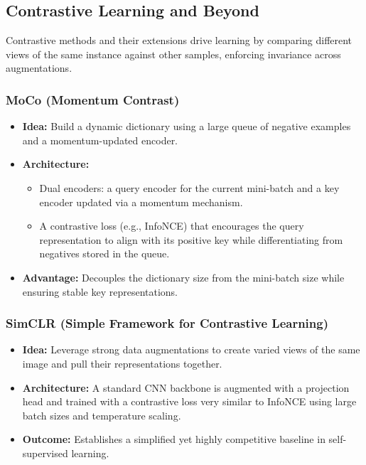 \documentclass{article}
\begin{document}
\subsection{Contrastive Learning and Beyond}

Contrastive methods and their extensions drive learning by comparing different views of the same instance against other samples, enforcing invariance across augmentations.

\subsubsection{MoCo (Momentum Contrast)}
\begin{itemize}
    \item \textbf{Idea:} Build a dynamic dictionary using a large queue of negative examples and a momentum-updated encoder.
    \item \textbf{Architecture:} 
    \begin{itemize}
        \item Dual encoders: a query encoder for the current mini-batch and a key encoder updated via a momentum mechanism.
        \item A contrastive loss (e.g., InfoNCE) that encourages the query representation to align with its positive key while differentiating from negatives stored in the queue.
    \end{itemize}
    \item \textbf{Advantage:} Decouples the dictionary size from the mini-batch size while ensuring stable key representations.
\end{itemize}

\subsubsection{SimCLR (Simple Framework for Contrastive Learning)}
\begin{itemize}
    \item \textbf{Idea:} Leverage strong data augmentations to create varied views of the same image and pull their representations together.
    \item \textbf{Architecture:} A standard CNN backbone is augmented with a projection head and trained with a contrastive loss very similar to InfoNCE using large batch sizes and temperature scaling.
    \item \textbf{Outcome:} Establishes a simplified yet highly competitive baseline in self-supervised learning.
\end{itemize}
\end{document}
